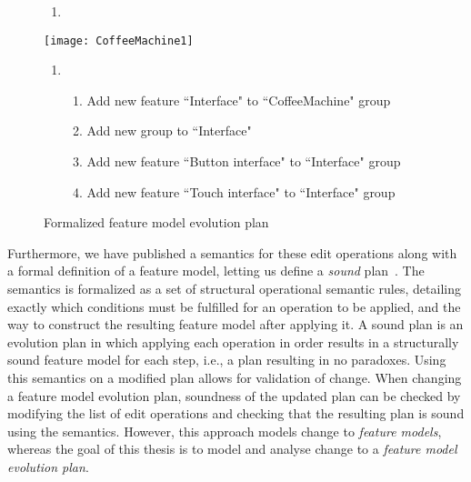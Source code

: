 \begin{figure}
   \footnotesize
   \begin{center}
      \begin{minipage}{0.98\textwidth}
         \begin{enumerate}[{\small $t_0$}]
            \item 
         \end{enumerate}
      \end{minipage}
      \texttt{[image: CoffeeMachine1]}
      \bigskip

      \begin{minipage}{0.98\textwidth}
         \begin{enumerate}[{\small $t_1$}]
            \item 
               \begin{enumerate}[ ]
                  \item Add new \mandatory{} feature ``Interface" to ``CoffeeMachine" \andtype{} group
                  \item Add new \xortype{} group to ``Interface"
                  \item Add new feature ``Button interface" to ``Interface" \xortype{} group
                  \item Add new feature ``Touch interface"  to ``Interface" \xortype{} group               \end{enumerate}
         \end{enumerate}
      \end{minipage}
      \caption{Formalized feature model evolution plan}
      \label{ex:formal-evolution-plan}
   \end{center}
\end{figure}

Furthermore, we have published a semantics for these edit operations along with a formal definition of a feature model, letting us define a \emph{sound} plan~\cite{art:consistency-preserving-evolution-planning}. The semantics is formalized as a set of structural operational semantic rules, detailing exactly which conditions must be fulfilled for an operation to be applied, and the way to construct the resulting feature model after applying it. A sound plan is an evolution plan in which applying each operation in order results in a structurally sound feature model for each step, i.e., a plan resulting in no paradoxes. Using this semantics on a modified plan allows for validation of change. When changing a feature model evolution plan, soundness of the updated plan can be checked by modifying the list of edit operations and checking that the resulting plan is sound using the semantics. However, this approach models change to \emph{feature models}, whereas the goal of this thesis is to model and analyse change to a \emph{feature model evolution plan}.

